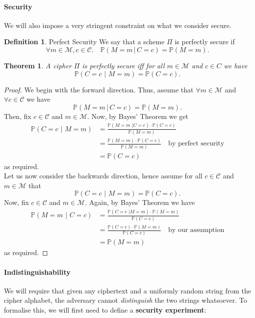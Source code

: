 \documentclass{article}
\newtheorem{theorem}{Theorem}[section]
\theoremstyle{definition}
\newtheorem{definition}{Definition}[section]
\theoremstyle{example}
\newcommand{\M}{\mathcal{M}}
\renewcommand{\C}{\mathcal{C}}
\newcommand{\Prob}{\mathbb{P}}
\begin{document}
\paragraph{Security} We will also impose a very stringent constraint on what we
consider secure.
\begin{definition}{Perfect Security}
  \label{def:perfect_security}
We say that a scheme $\Pi$ is perfectly secure if
\[
  \forall m \in \M, c \in \C.\quad \Prob(M=m \,|\, C=c) = \Prob(M=m).
\]
\end{definition}
\begin{theorem}
  \label{thm:perfect_sec_ciphertext}
  A cipher $\Pi$ is perfectly secure iff for all $m \in \M$ and $c \in C$
  we have
  \[
    \Prob(C = c\,\,|\,\, M=m) = \Prob(C = c).
  \]
\end{theorem}
\begin{proof}
  We begin with the forward direction. Thus, assume that $\forall m \in \M$ and
  $\forall c \in \C$ we have
  \[
    \Prob(M=m \,|\, C=c) = \Prob(M=m).
  \]
  Then, fix $c\in \C$ and $m \in \M$. Now, by Bayes' Theorem we get
  \begin{align*}
    \Prob(C=c \,\,|\,\, M = m) &= \frac{\Prob(M=m \,\,|C = c)\cdot\Prob(C = c)}{\Prob(M=m)} \\
                         &= \frac{\Prob(M=m)\cdot\Prob(C=c)}{\Prob(M=m)}\quad\text{by perfect security}\\
                         &= \Prob(C = c)
  \end{align*}
  as required.\\
  Let us now consider the backwards direction, hence assume for all $c\in \C$
  and $m\in \M$ that
  \[
    \Prob(C = c\,\,|\,\, M=m) = \Prob(C = c).
  \]
  Now, fix $c\in\C$ and $m\in\M$. Again, by Bayes' Theorem we have
  \begin{align*}
    \Prob(M=m \,\,|\,\, C = c) &= \frac{\Prob(C=c \,\,|M = m)\cdot\Prob(M = m)}{\Prob(C=c)} \\
                         &= \frac{\Prob(C=c)\cdot\Prob(M=m)}{\Prob(C=c)}\quad\text{by our assumption}\\
                         &= \Prob(M = m)
  \end{align*}
  as required.
\end{proof}
\paragraph{Indistinguishability} We will require that given any ciphertext and a uniformly
random string from the cipher alphabet, the adversary cannot
\textit{distinguish} the two strings whatsoever. To formalise this, we will
first need to define a \textbf{security experiment}:
\end{document}
